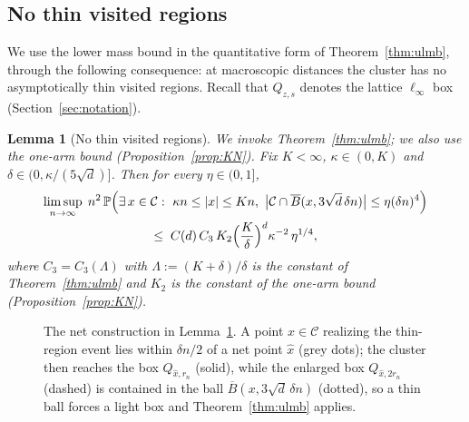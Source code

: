 \documentclass[11pt]{article}
\newtheorem{lemma}[theorem]{Lemma}
\theoremstyle{definition}
\theoremstyle{remark}
\newcommand{\bP}{\mathbb{P}}
\numberwithin{equation}{section}
\theoremstyle{plain}
\theoremstyle{definition}
\theoremstyle{remark}
\theoremstyle{plain}
\begin{document}
\subsection{No thin visited regions}

We use the lower mass bound in the quantitative form of
Theorem~\ref{thm:ulmb}, through the following consequence: at macroscopic
distances the cluster has no asymptotically thin visited regions. Recall that
$Q_{z,s}$ denotes the lattice $\ell_\infty$ box (Section~\ref{sec:notation}).


\begin{lemma}[No thin visited regions]\label{lem:nothin}
We invoke Theorem~\ref{thm:ulmb}; we also use the one-arm bound
(Proposition~\ref{prop:KN}).
Fix $K<\infty$, $\kappa\in(0,K)$ and
$\delta\in(0,\kappa/(5\sqrt d)]$. Then for every
$\eta\in(0,1]$,
\begin{multline*}
\limsup_{n\to\infty}\;
n^2\,\bP\Bigl(\exists\,x\in \mathcal C:\ \kappa n\le|x|\le Kn,\
\bigl|\mathcal C\cap \overline B(x,3\sqrt d\,\delta n)\bigr|\le\eta(\delta n)^4\Bigr)
\\
\le\;C(d)\,C_3\,K_2\Bigl(\frac{K}{\delta}\Bigr)^{d}\kappa^{-2}\,\eta^{1/4},
\end{multline*}
where $C_3=C_3(\Lambda)$ with $\Lambda:=(K+\delta)/\delta$ is the
constant of Theorem~\ref{thm:ulmb} and $K_2$ is the constant of the one-arm
bound (Proposition~\ref{prop:KN}).
\end{lemma}

\begin{figure}[htb]
\centering
%
\caption{The net construction in Lemma~\ref{lem:nothin}. A point
$x\in \mathcal C$ realizing the thin-region event lies within $\delta n/2$ of a net
point $\hat x$ (grey dots); the cluster then reaches the box
$Q_{\hat x,r_n}$ (solid), while the enlarged box
$Q_{\hat x,2r_n}$ (dashed) is contained in the ball
$\overline B(x,3\sqrt d\,\delta n)$ (dotted), so a thin ball forces a light box and
Theorem~\ref{thm:ulmb} applies.}
\label{fig:netconstruction}
\end{figure}
\end{document}
